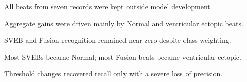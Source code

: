 \begin{highlights}
\item All beats from seven records were kept outside model development.
\item Aggregate gains were driven mainly by Normal and ventricular ectopic beats.
\item SVEB and Fusion recognition remained near zero despite class weighting.
\item Most SVEBs became Normal; most Fusion beats became ventricular ectopic.
\item Threshold changes recovered recall only with a severe loss of precision.
\end{highlights}
